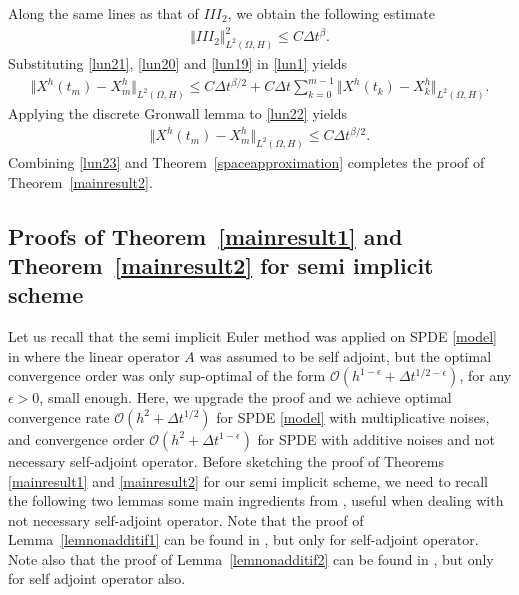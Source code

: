 \documentclass[review,12pt]{elsarticle}
\newcommand{\thmref}[1]{{Theorem~\ref{#1}}}
\newcommand{\lemref}[1]{{Lemma~\ref{#1}}}
\begin{document}
Along the same lines as that of $III_2$, we obtain the following estimate
\begin{eqnarray}
\label{lun21}
\Vert III_2\Vert^2_{L^2(\Omega, H)}\leq C\Delta t^{\beta}.
\end{eqnarray}
Substituting \eqref{lun21}, \eqref{lun20} and \eqref{lun19} in \eqref{lun1} yields
\begin{eqnarray}
\label{lun22}
\Vert X^h(t_m)-X^h_m\Vert_{L^2(\Omega, H)}\leq C\Delta t^{\beta/2}+C\Delta t\sum_{k=0}^{m-1}\Vert X^h(t_k)-X^h_k\Vert_{L^2(\Omega, H)}.
\end{eqnarray}
Applying the discrete Gronwall lemma to \eqref{lun22} yields
\begin{eqnarray}
\label{lun23}
\Vert X^h(t_m)-X^h_m\Vert_{L^2(\Omega, H)}\leq C\Delta t^{\beta/2}.
\end{eqnarray}
Combining \eqref{lun23} and \thmref{spaceapproximation} completes the proof of \thmref{mainresult2}.

\subsection{Proofs  of \thmref{mainresult1}  and \thmref{mainresult2}  for semi implicit scheme}
\label{fulldiscretization2}
Let us recall that  the semi implicit Euler method was applied on SPDE \eqref{model} in \cite{Yang}  where the linear operator $A$ was assumed to be self adjoint, but the optimal convergence order was  
only sup-optimal of the form $\mathcal{O}(h^{1-\epsilon}+\Delta t^{1/2-\epsilon})$, for any $\epsilon>0$, small enough. 
Here,  we  upgrade  the proof   and we achieve optimal convergence rate $\mathcal{O}(h^2+\Delta t^{1/2})$ 
for SPDE \eqref{model} with multiplicative noises, and convergence order  $\mathcal{O}\left(h^2+\Delta t^{1-\epsilon}\right)$ for SPDE 
with additive noises  and not necessary self-adjoint operator.
Before sketching the proof of  Theorems \ref{mainresult1} and \ref{mainresult2} for our semi  implicit scheme,
 we need to recall  the following two lemmas some main ingredients from \cite{Antjd2}, 
 useful when dealing with not necessary self-adjoint operator. Note that the proof of \lemref{lemnonadditif1} can be found in \cite[Theorems 7.8 \& 7.8]{Vidar}, 
 but only for self-adjoint operator.  Note also that the proof of \lemref{lemnonadditif2} can be found in \cite[Lemma 4.4]{Raphael}, but only for self adjoint operator also. 
\end{document}
